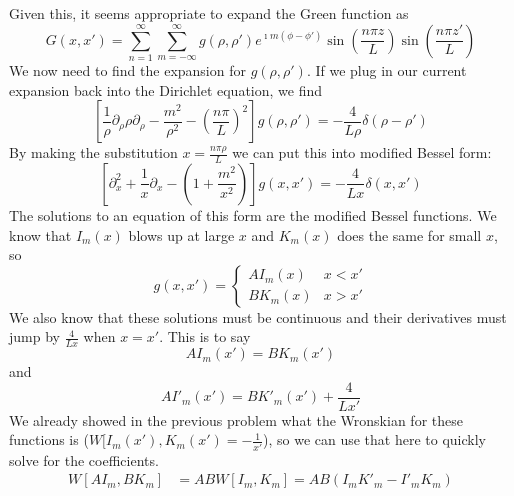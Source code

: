 \documentclass[a4paper,twoside]{article}
\begin{document}
\begin{itemize}
\begin{tcolorbox}[breakable]
            Given this, it seems appropriate to expand the Green function as
            \begin{equation}
                G(x,x') = \sum_{n=1}^{\infty} \sum_{m=- \infty}^{\infty} g(\rho, \rho') e^{\imath m(\phi-\phi')} \sin \left( \frac{n \pi z}{L} \right) \sin \left( \frac{n \pi z'}{L} \right)
            \end{equation}
            We now need to find the expansion for $ g(\rho, \rho') $. If we plug in our current expansion back into the Dirichlet equation, we find
            \begin{equation}
                \left[ \frac{1}{\rho} \partial_\rho \rho \partial_\rho - \frac{m^2}{\rho^2} - \left( \frac{n \pi}{L} \right)^2 \right] g(\rho,\rho') = - \frac{4}{L \rho} \delta(\rho - \rho')
            \end{equation}
            By making the substitution $ x = \frac{n \pi \rho}{L} $ we can put this into modified Bessel form:
            \begin{equation}
                \left[ \partial^2_x + \frac{1}{x} \partial_x - \left( 1 + \frac{m^2}{x^2} \right) \right] g(x,x') = - \frac{4}{L x}\delta(x,x')
            \end{equation}
            The solutions to an equation of this form are the modified Bessel functions. We know that $ I_m(x) $ blows up at large $ x $ and $ K_m(x) $ does the same for small $ x $, so
            \begin{equation}
                g(x,x') = \begin{cases} AI_m(x) & x<x'\\BK_m(x) & x>x' \end{cases} 
            \end{equation}
            We also know that these solutions must be continuous and their derivatives must jump by $ \frac{4}{Lx} $ when $ x = x' $. This is to say
            \begin{equation}
                A I_m(x') = B K_m(x')
            \end{equation}
            and
            \begin{equation}
                AI'_m(x') = BK'_m(x') + \frac{4}{L x'}
            \end{equation}
            We already showed in the previous problem what the Wronskian for these functions is ($ W[I_m(x'),K_m(x') = -\frac{1}{x'} $), so we can use that here to quickly solve for the coefficients.
            \begin{align}
                W[AI_m, BK_m] &= ABW[I_m, K_m] = AB(I_mK'_m - I'_mK_m)\\

\end{align}
\end{tcolorbox}
\end{itemize}
\end{document}
